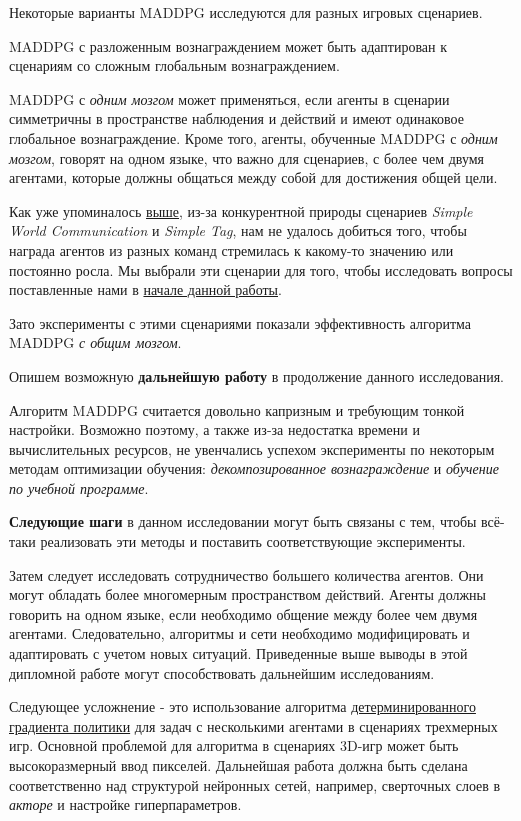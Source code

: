 Некоторые варианты MADDPG исследуются для разных игровых сценариев.

MADDPG с разложенным вознаграждением может быть адаптирован к сценариям со сложным глобальным вознаграждением.

MADDPG с \textit{одним мозгом} может применяться, если агенты в сценарии симметричны в пространстве наблюдения и действий и имеют одинаковое глобальное вознаграждение. Кроме того, агенты, обученные MADDPG с \textit{одним мозгом}, говорят на одном языке, что важно для сценариев, с более чем двумя агентами, которые должны общаться между собой для достижения общей цели.

Как уже упоминалось \hyperref[exp-results-svc]{выше}, из-за конкурентной природы сценариев \textit{Simple World Communication} и \textit{Simple Tag}, нам не удалось добиться того, чтобы награда агентов из разных команд стремилась к какому-то значению или постоянно росла. Мы выбрали эти сценарии для того, чтобы исследовать вопросы поставленные нами в \hyperref[intro-questions]{начале данной работы}.

Зато эксперименты с этими сценариями показали эффективность алгоритма MADDPG \textit{с общим мозгом}.

Опишем возможную \textbf{дальнейшую работу} в продолжение данного исследования.

Алгоритм MADDPG считается довольно капризным и требующим тонкой настройки. Возможно поэтому, а также из-за недостатка времени и вычислительных ресурсов, не увенчались успехом эксперименты по некоторым методам оптимизации обучения: \textit{декомпозированное вознаграждение} и \textit{обучение по учебной программе}.

\textbf{Следующие шаги} в данном исследовании могут быть связаны с тем, чтобы всё-таки реализовать эти методы и поставить соответствующие эксперименты.

Затем следует исследовать сотрудничество большего количества агентов. Они могут обладать более многомерным пространством действий. Агенты должны говорить на одном языке, если необходимо общение между более чем двумя агентами. Следовательно, алгоритмы и сети необходимо модифицировать и адаптировать с учетом новых ситуаций. Приведенные выше выводы в этой дипломной работе могут способствовать дальнейшим исследованиям.

Следующее усложнение - это использование алгоритма \hyperref[acr:dpg]{детерминированного градиента политики} для задач с несколькими агентами в сценариях трехмерных игр. Основной проблемой для алгоритма в сценариях 3D-игр может быть высокоразмерный ввод пикселей. Дальнейшая работа должна быть сделана соответственно над структурой нейронных сетей, например, сверточных слоев в \textit{акторе} и настройке гиперпараметров.

